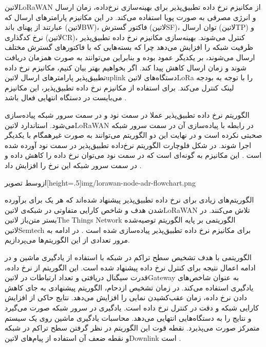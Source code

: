 ‌لاتین{LoRaWAN} از مکانیزم نرخ داده تطبیق‌پذیر برای بهینه‌سازی نرخ‌داده، زمان ارسال و انرژی مصرفی به صورت پویا استفاده می‌کند.
در این مکانیزم پارامترهای ارسال که عبارتند از پهنای باند (‌لاتین{BW})، فاکتور گسترش (‌لاتین{SF})،
توان ارسال (‌لاتین{TP}) و نرخ کدگذاری (‌لاتین{CR})، کنترل می‌شوند.
بهینه‌سازی مکانیزم نرخ داده تطبیق‌پذیر ظرفیت شبکه را افزایش می‌دهد چرا که بسته‌هایی که با فاکتورهای گسترش مختلف ارسال می‌شوند،
بر یکدیگر عمود بوده و بنابراین می‌توانند به صورت همزمان دریافت شوند و زمان ارسال کاهش پیدا کند.
اگر بخواهیم بهتر بیان کنیم، مکانیزم نرخ داده تطبیق‌پذیر پارامترهای ارسال ‌لاتین{uplink} دستگاه‌های ‌لاتین{LoRa}
را با توجه به بودجه لینک کنترل می‌کند. برای استفاده از مکانیزم نرخ داده تطبیق‌پذیر، این مکانیزم می‌بایست در دستگاه انتهایی فعال باشد
.

الگوریتم نرخ داده تطبیق‌پذیر عملا در سمت نود و در سمت سرور شبکه پیاده‌سازی می‌شود. استاندارد ‌لاتین{LoRaWAN}
در رابطه با پیاده‌سازی آن در سمت سرور شبکه صحبتی نکرده است و در نهایت این دو الگوریتم می‌توانند به صورت غیرهمگام با یکدیگر
اجرا شوند. در شکل  فلوچارت الگوریتم نرخ‌داده تطبیق‌پذیر
در سمت نود آورده شده است
.
این مکانیزم به گونه‌ای است که در سمت نود می‌توان نرخ داده را کاهش داده و در سمت سرور شبکه این نرخ را افزایش داد
.

‌ازوسط
‌تصویر[height=.5\textwidth]{img/lorawan-node-adr-flowchart.png}

الگوریتم‌های زیادی برای نرخ داده تطبیق‌پذیر پیشنهاد شده‌اند که هر یک برای برآورده شدن هدف و شاخص کارایی متفاوتی در شبکه‌ی ‌لاتین{LoRaWAN}
تلاش می‌کنند.
در بستر متن‌باز ‌لاتین{The Things Network}
الگوریتمی بر پایه الگوریتم توصیه‌شده ‌لاتین{Semtech} برای مکانیزم نرخ داده تطبیق‌پذیر پیاده‌سازی شده است
. در ادامه به مرور تعدادی از این الگوریتم‌ها می‌پردازیم.

الگوریتمی با هدف تشخیص سطح تراکم در شبکه با استفاده از یادگیری ماشین و در ادامه اعمال نتیجه برای کنترل نرخ داده پیشنهاد شده است.
این الگوریتم از نرخ داده، قدرت سیگنال دریافتی و تعداد ارتباطات در ‌لاتین{Gateway} به عنوان شاخص‌های یادگیری استفاده می‌کند.
در زمان تشخیص ازدحام، الگوریتم پیشنهادی به جای کاهش دادن نرخ داده، زمان عقب‌کشیدن نمایی را افزایش می‌دهد.
نتایج حاکی از افزایش کارایی شبکه و دقت در کنترل نرخ داده است. یادگیری در سرور شبکه صورت می‌گیرد و نتایج را به دستگاه‌هایی انتهایی می‌دهد.
محاسبات یادگیری ماشین روی یک سیستم متمرکز صورت می‌پذیرد. نقطه قوت این الگوریتم در نظر گرفتن سطح تراکم در شبکه و نقطه ضعف آن استفاده
از پیام‌های ‌لاتین{Downlink} است
.

